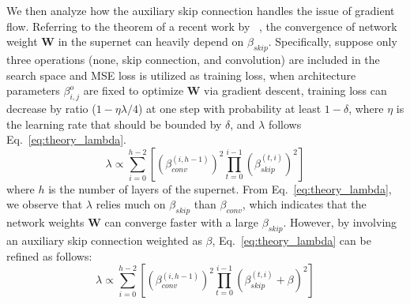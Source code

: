 \documentclass{article} \usepackage{iclr2021_conference,times}
\begin{document}
We then analyze how the auxiliary skip connection handles the issue of gradient flow. Referring to the theorem of a recent work by ~\cite{zhou2020theory}, the convergence of network weight $\mathbf{W}$ in the supernet can heavily depend on $\beta_{skip}$. Specifically, suppose only three operations (none, skip connection, and convolution) are included in the search space and MSE loss is utilized as training loss, when architecture parameters $\beta^o_{i,j}$ are fixed to optimize $\mathbf{W}$ via gradient descent, training loss can decrease by ratio ($1-\eta \lambda/4$) at one step with probability at least $1-\delta$, where $\eta$ is the learning rate that should be bounded by $\delta$, and $\lambda$ follows Eq.~\ref{eq:theory_lambda}.
\begin{equation}
\lambda \propto \sum_{i=0}^{h-2} \left[ \left(\beta^{(i,h-1)}_{conv}\right)^2 \prod_{t=0}^{i-1}\left(\beta^{(t,i)}_{skip}\right)^2 \right]
\label{eq:theory_lambda}
\end{equation}
where $h$ is the number of layers of the supernet. From Eq.~\ref{eq:theory_lambda}, we observe that $\lambda$ relies much on $\beta_{skip}$ than $\beta_{conv}$, which indicates that the network weights $\mathbf{W}$ can converge faster with a large $\beta_{skip}$. 
However, by involving an auxiliary skip connection weighted as $\beta$, Eq.~\ref{eq:theory_lambda} can be refined as follows:
\begin{equation}
\lambda \propto \sum_{i=0}^{h-2} \left[ \left(\beta^{(i,h-1)}_{conv}\right)^2 \prod_{t=0}^{i-1}\left(\beta^{(t,i)}_{skip} + \beta \right)^2 \right]
\label{eq:theory_lambda_ours}
\end{equation}
\end{document}
